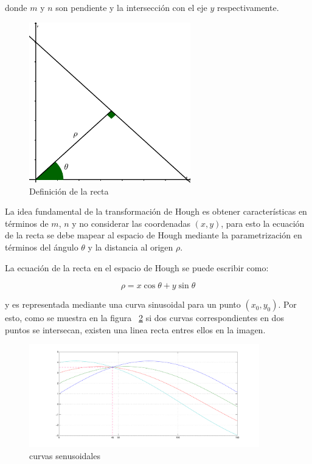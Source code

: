 donde $m$ y $n$ son pendiente y la intersección con el eje $y$ respectivamente. 

\begin{figure}[h]{}
 \centering
 \includegraphics[width=70mm]{./fig/houghlineal}
 \caption{Definición de la recta}
 \label{fig:houghlineal}
\end{figure}



La idea fundamental de la transformación de Hough es obtener características en términos de $m$, $n$ y no considerar las
coordenadas $(x,y)$, para esto la ecuación de la recta se debe mapear al espacio de Hough mediante la parametrización en
términos del ángulo $\theta$ y la distancia al origen $\rho$.



%


La ecuación de la recta en el espacio de Hough se puede escribir como:

\begin{equation}
\rho = x\cos\theta + y\sin\theta
\end{equation}

y es representada mediante una curva sinusoidal para un punto $(x_{0},y_{0})$. Por esto, como
se muestra en la figura ~\ref{fig:houghlinespace} si dos curvas correspondientes en dos puntos se intersecan,
existen una linea recta entres ellos en la imagen.
\begin{figure}[h]{}
 \centering
 \includegraphics[width=100mm]{./fig/houghlinespace}
 \caption{curvas senusoidales}
 \label{fig:houghlinespace}
\end{figure}



